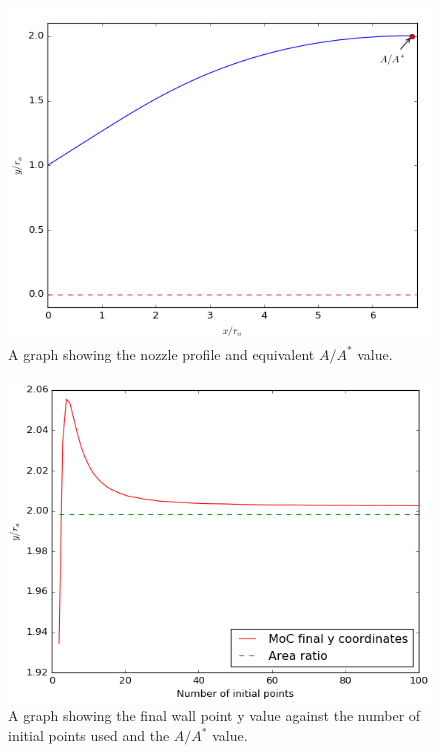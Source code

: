 \documentclass[10pt,a4paper]{article}
\begin{document}
\begin{figure}[!htb]
\centering
\includegraphics[scale=0.75]{nozzle.png}
\caption{A graph showing the nozzle profile and equivalent $A/A^{*}$ value.}
\label{fig:nozzle_profile}
\end{figure}
\begin{figure}[!htb]
\centering
\includegraphics[scale=0.75]{accuracy.png}
\caption{A graph showing the final wall point y value against the number of initial points used and the $A/A^{*}$ value.}
\label{fig:y_coordinates}
\end{figure}
\end{document}
